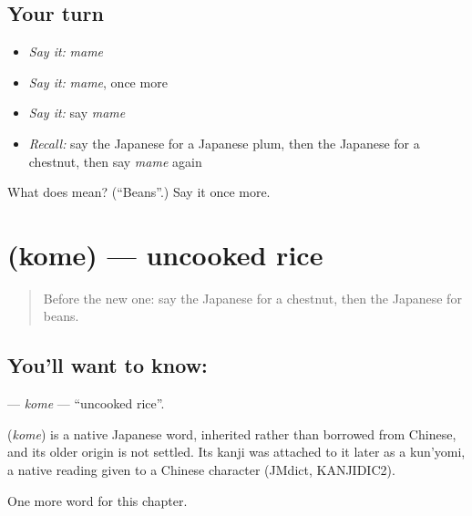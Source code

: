 \subsection*{Your turn}
\begin{itemize}
\raggedright
  \item \emph{Say it:} \emph{mame}
  \item \emph{Say it:} \emph{mame}, once more
  \item \emph{Say it:} say \emph{mame}
  \item \emph{Recall:} say the Japanese for a Japanese plum, then the Japanese for a chestnut, then say \emph{mame} again
\end{itemize}

\begin{tcolorbox}[breakable,colback=teal!4,colframe=teal!35!black,title={Before you move on}]
What does  mean? (\textquotedblleft{}Beans\textquotedblright{}.) Say it once more.
\end{tcolorbox}
\section[\texorpdfstring{\ja{こめ} (kome)}{こめ (kome)}]{ (kome) — uncooked rice}

\label{lesson:JA-C36-kome}



\begin{quote}
Before the new one: say the Japanese for a chestnut, then the Japanese for beans.
\end{quote}

\subsection*{You'll want to know: }
\textbf{} — \emph{kome} — \textquotedblleft{}uncooked rice\textquotedblright{}.

\begin{cousinweb}
\textbf{} (\emph{kome}) is a native Japanese word, inherited rather than borrowed from Chinese, and its older origin is not settled. Its kanji was attached to it later as a kun'yomi, a native reading given to a Chinese character (JMdict, KANJIDIC2).
\end{cousinweb}

\begin{grammarlens}[title={What you've built}]
One more word for this chapter.
\end{grammarlens}

